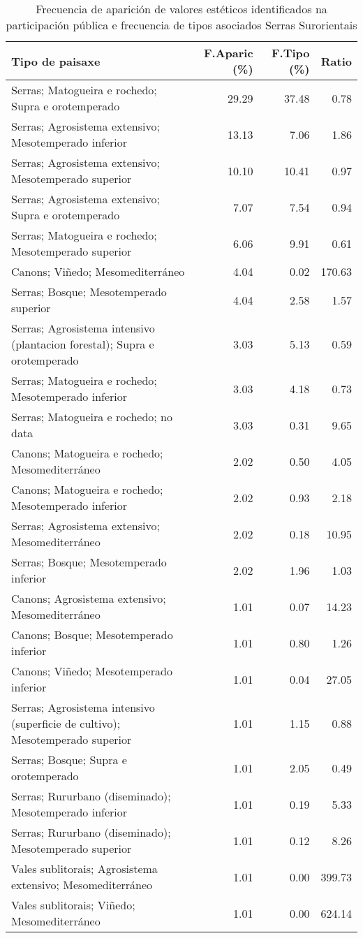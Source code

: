 \begin{table}[p]
\centering
\caption{Frecuencia de aparición de valores estéticos identificados na participación pública e frecuencia de tipos asociados Serras Surorientais} 
\label{vsixotest9}
\begin{tabular}{lrrr}
  \hline
Tipo de paisaxe & F.Aparic (\%) & F.Tipo (\%) & Ratio \\ 
  \hline
Serras; Matogueira e rochedo; Supra e orotemperado & 29.29 & 37.48 & 0.78 \\ 
  Serras; Agrosistema extensivo; Mesotemperado inferior & 13.13 & 7.06 & 1.86 \\ 
  Serras; Agrosistema extensivo; Mesotemperado superior & 10.10 & 10.41 & 0.97 \\ 
  Serras; Agrosistema extensivo; Supra e orotemperado & 7.07 & 7.54 & 0.94 \\ 
  Serras; Matogueira e rochedo; Mesotemperado superior & 6.06 & 9.91 & 0.61 \\ 
  Canons; Viñedo; Mesomediterráneo & 4.04 & 0.02 & 170.63 \\ 
  Serras; Bosque; Mesotemperado superior & 4.04 & 2.58 & 1.57 \\ 
  Serras; Agrosistema intensivo (plantacion forestal); Supra e orotemperado & 3.03 & 5.13 & 0.59 \\ 
  Serras; Matogueira e rochedo; Mesotemperado inferior & 3.03 & 4.18 & 0.73 \\ 
  Serras; Matogueira e rochedo; no data & 3.03 & 0.31 & 9.65 \\ 
  Canons; Matogueira e rochedo; Mesomediterráneo & 2.02 & 0.50 & 4.05 \\ 
  Canons; Matogueira e rochedo; Mesotemperado inferior & 2.02 & 0.93 & 2.18 \\ 
  Serras; Agrosistema extensivo; Mesomediterráneo & 2.02 & 0.18 & 10.95 \\ 
  Serras; Bosque; Mesotemperado inferior & 2.02 & 1.96 & 1.03 \\ 
  Canons; Agrosistema extensivo; Mesomediterráneo & 1.01 & 0.07 & 14.23 \\ 
  Canons; Bosque; Mesotemperado inferior & 1.01 & 0.80 & 1.26 \\ 
  Canons; Viñedo; Mesotemperado inferior & 1.01 & 0.04 & 27.05 \\ 
  Serras; Agrosistema intensivo (superficie de cultivo); Mesotemperado superior & 1.01 & 1.15 & 0.88 \\ 
  Serras; Bosque; Supra e orotemperado & 1.01 & 2.05 & 0.49 \\ 
  Serras; Rururbano (diseminado); Mesotemperado inferior & 1.01 & 0.19 & 5.33 \\ 
  Serras; Rururbano (diseminado); Mesotemperado superior & 1.01 & 0.12 & 8.26 \\ 
  Vales sublitorais; Agrosistema extensivo; Mesomediterráneo & 1.01 & 0.00 & 399.73 \\ 
  Vales sublitorais; Viñedo; Mesomediterráneo & 1.01 & 0.00 & 624.14 \\ 
   \hline
\end{tabular}
\end{table}

